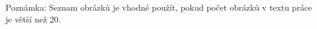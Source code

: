 \openright
\listoffigures
Poznámka: Seznam obrázků je vhodné použít, pokud počet obrázků v textu práce je větší než 20.